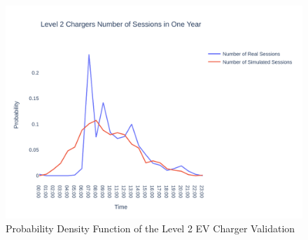 \documentclass[conference]{IEEEtran}
\begin{document}
		\begin{figure}[H]
			\centering
			\includegraphics[width=1\linewidth]{Fig/l2_avg_day_rand_poisson_1_hour_pdf}
			\caption{Probability Density Function of the Level 2 EV Charger Validation}
			\label{fig:l2avgdayrandpoisson1hourpdf}
		\end{figure}

		
\end{document}
